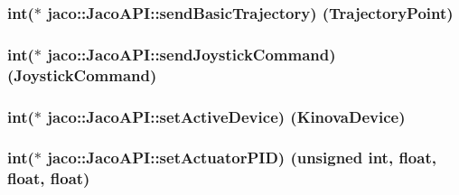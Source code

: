 \subsubsection[{\texorpdfstring{send\+Basic\+Trajectory}{sendBasicTrajectory}}]{\setlength{\rightskip}{0pt plus 5cm}int($\ast$ jaco\+::\+Jaco\+A\+P\+I\+::send\+Basic\+Trajectory) ({\bf Trajectory\+Point})}\hypertarget{classjaco_1_1_jaco_a_p_i_acbaea3e47825b270d85d783c9f29d472}{}\label{classjaco_1_1_jaco_a_p_i_acbaea3e47825b270d85d783c9f29d472}
\subsubsection[{\texorpdfstring{send\+Joystick\+Command}{sendJoystickCommand}}]{\setlength{\rightskip}{0pt plus 5cm}int($\ast$ jaco\+::\+Jaco\+A\+P\+I\+::send\+Joystick\+Command) ({\bf Joystick\+Command})}\hypertarget{classjaco_1_1_jaco_a_p_i_a57328804ef00fd40492ba065be3fe3f1}{}\label{classjaco_1_1_jaco_a_p_i_a57328804ef00fd40492ba065be3fe3f1}
\subsubsection[{\texorpdfstring{set\+Active\+Device}{setActiveDevice}}]{\setlength{\rightskip}{0pt plus 5cm}int($\ast$ jaco\+::\+Jaco\+A\+P\+I\+::set\+Active\+Device) ({\bf Kinova\+Device})}\hypertarget{classjaco_1_1_jaco_a_p_i_a4e0c8fc007f20e985545b59abf571ea0}{}\label{classjaco_1_1_jaco_a_p_i_a4e0c8fc007f20e985545b59abf571ea0}
\subsubsection[{\texorpdfstring{set\+Actuator\+P\+ID}{setActuatorPID}}]{\setlength{\rightskip}{0pt plus 5cm}int($\ast$ jaco\+::\+Jaco\+A\+P\+I\+::set\+Actuator\+P\+ID) (unsigned int, float, float, float)}\hypertarget{classjaco_1_1_jaco_a_p_i_a3fff8abf62a8b45c1905bad4c5592126}{}\label{classjaco_1_1_jaco_a_p_i_a3fff8abf62a8b45c1905bad4c5592126}
